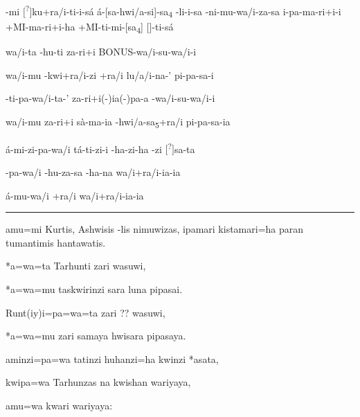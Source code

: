 \documentclass{luvita}
\begin{document}
\setcounter{parcount}{0}
\begin{parnumbersa}[]

	\raggedright%
	\itshape%

	-mi
	$[$\lmasc\textsuperscript{?}$]$ku+ra/i-ti-i-sá
	\lmasc{}á-[sa-hwi/a-si]-sa\textsubscript{4}
	\lmasc{}-li-i-sa
	\lmasc{}-ni-mu-wa/i-za-sa
	i-pa-ma-ri+i-i
	\lmasc{}+MI-ma-ri+i-ha
	\lmasc{}
	\lmasc{}+MI-ti-mi-[sa\textsubscript{4}]
	\lbreak{} $[$\lmasc$]$-ti-sá


	\lmasc{}wa/i-ta
	\lmasc{}-hu-ti
	\lmasc{}za-ri+i
	\lmasc{}BONUS-wa/i-su-wa/i-i


	\lmasc{}wa/i-mu
	\lmasc{}-kwi+ra/i-zi
	\lmasc{}+ra/i
	\lmasc{}lu/a/i-na-'
	\lmasc{}pi-pa-sa-i


	\lmasc{}-ti-pa-wa/i-ta-'
	\lmasc{}za-ri+i{(-)}ia{(-)}pa-a
	\lmasc{}-wa/i-su-wa/i-i


	\lmasc{}wa/i-mu
	\lmasc{}za-ri+i
	\lmasc{}sà-ma-ia
	\lbreak{}\lmasc{}-hwi/a-sa\textsubscript{5}+ra/i
	\lmasc{}pi-pa-sa-ia


	\lmasc{}á-mi-zi-pa-wa/i
	\lmasc{}tá-ti-zi-i
	\lmasc{}-ha-zi-ha
	\lmasc{}-zi
	$[$\lmasc\textsuperscript{?}$]$sa-ta


	\lmasc{}-pa-wa/i -hu-za-sa
	\lmasc{}
	\lmasc{}-ha-na
	\lmasc{}wa/i+ra/i-ia-ia


	\lmasc{}á-mu-wa/i
	\lmasc{}+ra/i
	\lmasc{}wa/i+ra/i-ia-ia



\end{parnumbersa}

\vspace{10pt}
\hrule
\vspace{10pt}


\setcounter{parcount}{0}
\begin{parnumbersa}[]

	\raggedright%
	\itshape%

	amu=mi Kurtis, Ashwisis -lis nimuwizas,
	ipamari kistamari=ha paran tumantimis hantawatis.

	*a=wa=ta Tarhunti zari wasuwi,

	*a=wa=mu taskwirinzi sara luna pipasai.

	Runt{(iy)}i=pa=wa=ta zari {??} wasuwi,

	*a=wa=mu zari samaya hwisara pipasaya.

	aminzi=pa=wa tatinzi huhanzi=ha kwinzi *asata,

	kwipa=wa Tarhunzas na kwishan wariyaya,

	amu=wa kwari wariyaya:


\end{parnumbersa}
\end{document}
